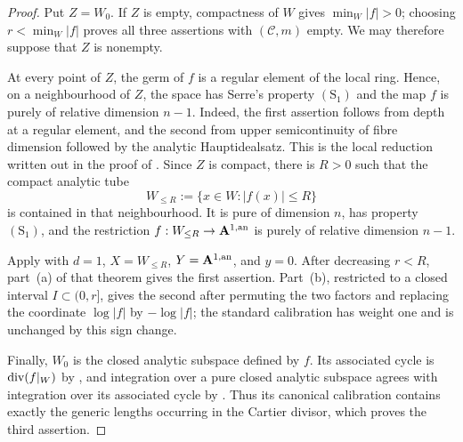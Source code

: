 \begin{proof}
Put $Z=W_0$.  If $Z$ is empty, compactness of $W$ gives
$\min_W|f|>0$; choosing $r<\min_W|f|$ proves all three assertions with
$(\mathscr C,m)$ empty.  We may therefore suppose that $Z$ is nonempty.

At every point of $Z$, the germ of $f$ is a regular element of the local
ring.  Hence, on a neighbourhood of $Z$, the space has Serre's property
$(\mathrm S_1)$ and the map $f$ is purely of relative dimension $n-1$.
Indeed, the first assertion follows from depth at a regular element, and
the second from upper semicontinuity of fibre dimension followed by the
analytic Hauptidealsatz.  This is the local reduction written out in the
proof of \cite[Lemma~16.7.5]{CLD25}.  Since $Z$ is compact, there is
$R>0$ such that the compact analytic tube
\[
                 W_{\leq R}:=\{x\in W:|f(x)|\leq R\}
\]
is contained in that neighbourhood.  It is pure of dimension $n$, has
property $(\mathrm S_1)$, and the restriction
$f:W_{\leq R}\to\mathbf A^{1,\mathrm{an}}$ is purely of relative dimension
$n-1$.

Apply \cite[Theorem~14.7.2]{CLD25} with $d=1$,
$X=W_{\leq R}$, $Y=\mathbf A^{1,\mathrm{an}}$, and $y=0$.  After decreasing
$r<R$, part~(a) of that theorem gives the first assertion.  Part~(b),
restricted to a closed interval $I\subset(0,r]$, gives the second after
permuting the two factors and replacing the coordinate $\log|f|$ by
$-\log|f|$; the standard calibration has weight one and is unchanged by
this sign change.

Finally, $W_0$ is the closed analytic subspace defined by $f$.  Its
associated cycle is $\operatorname{div}(f|_W)$ by \cite[\S13.7.1]{CLD25}, and
integration over a pure closed analytic subspace agrees with integration
over its associated cycle by \cite[Proposition~16.6.3]{CLD25}.  Thus its
canonical calibration contains exactly the generic lengths occurring in
the Cartier divisor, which proves the third assertion.
\end{proof}

